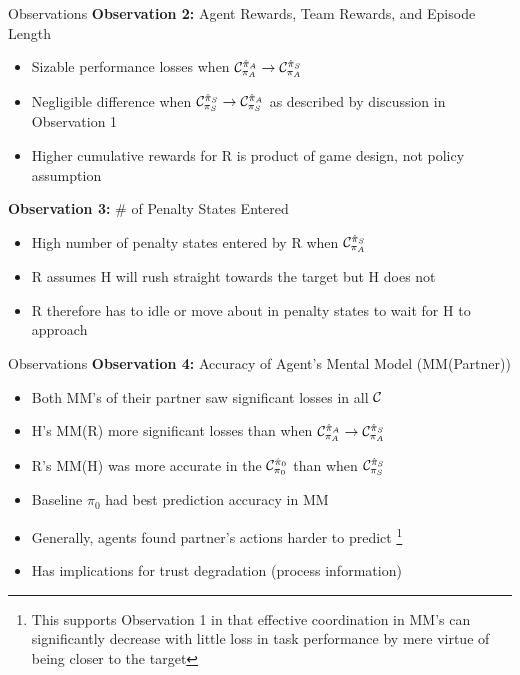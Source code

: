 \documentclass[aspectratio=1610, xcolor=dvipsnames]{packages/beamer}
\begin{document}
\begin{frame}{Observations}
    \textbf{Observation 2:} Agent Rewards, Team Rewards, and Episode Length
    \begin{itemize}
        \item Sizable performance losses when $\cond[A][A] \rightarrow \cond[S][A]$
        \item Negligible difference when $\cond[S][S] \rightarrow \cond[A][S]$  as described by discussion in Observation 1
        \item Higher cumulative rewards for R is product of game design, not policy assumption
    \end{itemize}

    \textbf{Observation 3:} \# of Penalty States Entered
    \begin{itemize}
        \item High number of penalty states entered by R when $\cond[S][A] $
        \item R assumes H will rush straight towards the target but H does not
        \item R therefore has to idle or move about in penalty states to wait for H to approach
    \end{itemize}
\end{frame}

\begin{frame}{Observations}
    \textbf{Observation 4:} Accuracy of Agent's Mental Model (MM(Partner))
    \begin{itemize}
        \item Both MM's of their partner saw significant losses in all $\cond[][]$
        \item H's MM(R) more significant losses than when $\cond[A][A] \rightarrow \cond[S][A]$
        \item R's MM(H) was more accurate in the $\cond[0][0]$ than when $\cond[S][S]$
        \item Baseline $\pi_0$ had best prediction accuracy in MM
        \item Generally, agents found partner's actions harder to predict
        \footnote{This supports Observation 1 in that effective coordination in MM's can significantly decrease
        with little loss in task performance by mere virtue of being closer to the target}
        \item Has implications for trust degradation (process information)
    \end{itemize}

\end{frame}
\end{document}
